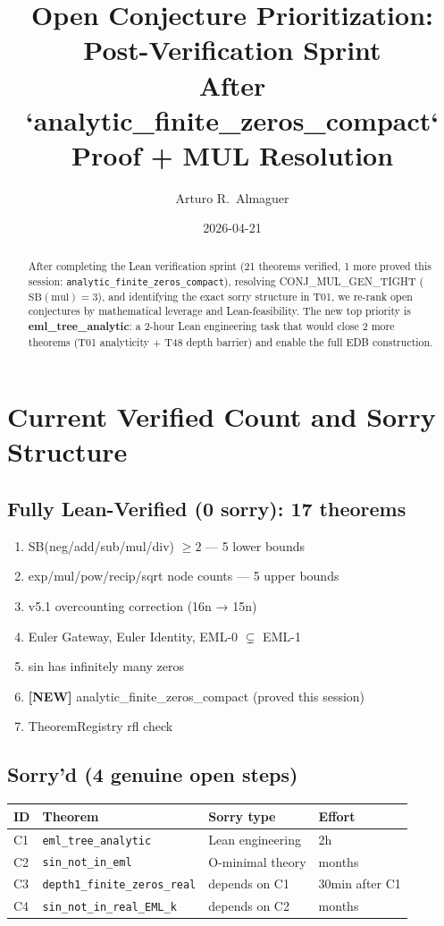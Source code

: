 \documentclass[12pt]{article}
\title{\textbf{Open Conjecture Prioritization: Post-Verification Sprint}\\[0.4em]
\large After `analytic\_finite\_zeros\_compact` Proof + MUL Resolution}
\author{Arturo R.\ Almaguer}
\date{2026-04-21}
\theoremstyle{definition}
\begin{document}
\maketitle

\begin{abstract}
After completing the Lean verification sprint (21 theorems verified, 1 more proved this
session: \texttt{analytic\_finite\_zeros\_compact}), resolving CONJ\_MUL\_GEN\_TIGHT
($\mathrm{SB}(\mathrm{mul}) = 3$), and identifying the exact sorry structure in T01, we
re-rank open conjectures by mathematical leverage and Lean-feasibility.
The new top priority is \textbf{eml\_tree\_analytic}: a 2-hour Lean engineering task
that would close 2 more theorems (T01 analyticity + T48 depth barrier) and enable the
full EDB construction.
\end{abstract}

\section{Current Verified Count and Sorry Structure}

\subsection{Fully Lean-Verified (0 sorry): 17 theorems}
\begin{enumerate}[noitemsep]
  \item SB(neg/add/sub/mul/div) $\geq 2$ — 5 lower bounds
  \item exp/mul/pow/recip/sqrt node counts — 5 upper bounds
  \item v5.1 overcounting correction (16n → 15n)
  \item Euler Gateway, Euler Identity, EML-0 $\subsetneq$ EML-1
  \item sin has infinitely many zeros
  \item \textbf{[NEW]} analytic\_finite\_zeros\_compact (proved this session)
  \item TheoremRegistry rfl check
\end{enumerate}

\subsection{Sorry'd (4 genuine open steps)}

\begin{center}
\begin{tabular}{llll}
\toprule
ID & Theorem & Sorry type & Effort \\
\midrule
C1 & \texttt{eml\_tree\_analytic} & Lean engineering & 2h \\
C2 & \texttt{sin\_not\_in\_eml} & O-minimal theory & months \\
C3 & \texttt{depth1\_finite\_zeros\_real} & depends on C1 & 30min after C1 \\
C4 & \texttt{sin\_not\_in\_real\_EML\_k} & depends on C2 & months \\
\bottomrule
\end{tabular}
\end{center}
\end{document}
